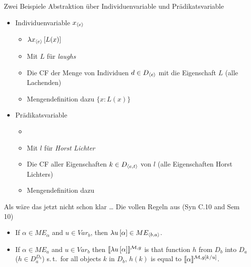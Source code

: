 \begin{frame}
  {Zwei Beispiele}
  \onslide<+->
  \onslide<+->
  Abstraktion über \alert{Individuenvariable} und \alert{Prädikatsvariable}\\
  \Halbzeile
  \begin{itemize}[<+->]
    \item Individuenvariable \alert{$x_{{\langle{}e\rangle}}$} 
      \begin{itemize}[<+->]
        \item \alert{$\lambda{}x_{{\langle{}e\rangle}}\left[{}L(x)\right]$}
        \item Mit $L$ \zB für \textit{laughs}
        \item Die CF der Menge von Individuen $d\in{}D_{{\langle{}e\rangle}}$ mit die Eigenschaft $L$ (alle Lachenden)
        \item Mengendefinition dazu \alert{$\{x: L(x)\}$}
      \end{itemize}
      \Halbzeile
    \item Prädikatsvariable  
      \begin{itemize}[<+->]
        \item {}
        \item Mit $l$ \zB für \textit{Horst Lichter}
        \item Die CF aller Eigenschaften $k\in{}D_{{\langle{}e,t\rangle}}$ von $l$ (alle Eigenschaften Horst Lichters)
        \item Mengendefinition dazu 
      \end{itemize}
  \end{itemize}
\end{frame}

\begin{frame}
  {Als wäre das jetzt nicht schon klar \ldots}
  \onslide<+->
  \onslide<+->
  Die vollen Regeln aus \citet[102]{DowtyEa1981} (Syn C.10 and Sem 10)\\
  \Halbzeile
    \begin{itemize}[<+->]
      \item If $\alpha\in{}ME_{\alpha}$ and $u\in{}Var_b$, then $\lambda{}u\left[{}\alpha\right]\in{}ME_{{\langle{}b,a\rangle}}$.
      \item If $\alpha\in{}ME_a$ and $u\in{}Var_b$ then $\llbracket{}\lambda{}u\left[{}\alpha\right]\rrbracket^{\mathcal{M},g}$ is that function $h$ from $D_b$ into $D_a$\\
        ($h\in D_a^{D_b}$) s.\,t.\ for all objects $k$ in $D_b$, $h(k)$ is equal to $\llbracket{}\alpha\rrbracket^{\mathcal{M},g\left[{}k/u\right]}$.
    \end{itemize}
  \Halbzeile
\end{frame}

